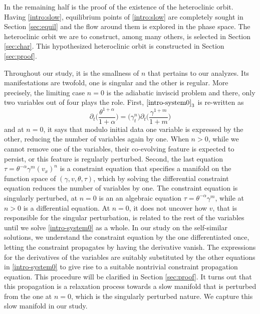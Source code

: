 \documentclass[a4paper,11pt]{article}
\theoremstyle{remark}
\begin{document}
In the remaining half is the proof of the existence of the heteroclinic orbit. Having \eqref{intro:slow}, equilibrium points of \eqref{intro:slow} are completely sought in Section \ref{sec:equil} and the flow around them is explored in the phase space. The heteroclinic orbit we are to construct, among many others, is selected in Section \ref{sec:char}. This hypothesized heteroclinic orbit is constructed in Section \ref{sec:proof}.

Throughout our study, it is the smallness of $n$ that pertains to our analyzes. Its manifestations are twofold, one is singular and the other is regular. More precisely, the limiting case $n=0$ is the adiabatic inviscid problem and there, only two variables out of four plays the role. First, $\eqref{intro-system0}_3$ is re-written as
$$ \partial_t\Big(\frac{\theta^{1+\alpha}}{1+\alpha}\Big) = \big(\gamma_t^n\big)\partial_t\Big(\frac{\gamma^{1+m}}{1+m}\Big)$$
and at $n=0$, it says that modulo initial data one variable is expressed by the other, reducing the number of variables again by one. When $n>0$, while we cannot remove one of the variables, their co-evolving feature is expected to persist, or this feature is regularly perturbed. Second, the last equation $\tau=\theta^{-\alpha}\gamma^m(v_x)^n$ is a constraint equation that specifies a manifold on the function space of $(\gamma,v,\theta,\tau)$, which by solving the differential constraint equation reduces the number of variables by one. The constraint equation is singularly perturbed, at $n=0$ is an an algebraic equation $\tau=\theta^{-\alpha}\gamma^m$, while at $n>0$ is a differential equation. %
At $n=0$, it does not uncover how $v$, that is responsible for the singular perturbation, is related to the rest of the variables until we solve \eqref{intro-system0} as a whole. In our study on the self-similar solutions, we understand the constraint equation by the one differentiated once, letting the constraint propagates by having the derivative vanish. The expressions for the derivatives of the variables are suitably substituted by the other equations in \eqref{intro-system0} to give rise to a suitable nontrivial constraint propagation equation. This procedure will be clarified in Section \ref{sec:proof}. It turns out that this propagation is a relaxation process towards a slow manifold that is perturbed from the one at $n=0$, which is the singularly perturbed nature. We capture this slow manifold in our study.

\end{document}
